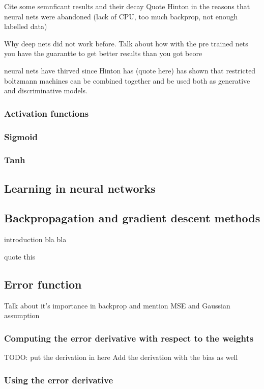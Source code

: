 \documentclass[11pt, fleqn, twoside]{article}
\begin{document}
 Cite some semnficant results and their decay
 Quote Hinton in the reasons that neural nets were abandoned (lack of CPU, too much backprop, not enough labelled data)

 Why deep nets did not work before. Talk about how with the pre trained nets you have the guarantte to get better results
  than you got beore

 neural nets have thirved since Hinton has (quote here) has shown that restricted boltzmann machines can be combined together and be used both as generative and discriminative models.

\subsubsection{Activation functions}

\subsubsection{Sigmoid}

\subsubsection{Tanh}

\subsection{Learning in neural networks}

\subsection{Backpropagation and gradient descent methods}
  introduction bla bla

  quote this \cite{LeCun1998}

\subsection{Error function}
  Talk about it's importance in backprop and mention MSE and Gaussian assumption

\subsubsection {Computing the error derivative with respect to the weights}
  TODO: put the derivation in here
  Add the derivation with the  bias as well

\subsubsection {Using the error derivative}
\end{document}
